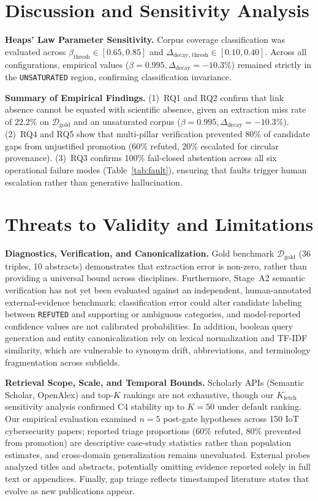 \documentclass[runningheads]{llncs}
\begin{document}
\section{Discussion and Sensitivity Analysis}
\label{sec:discussion}

\noindent\textbf{Heaps' Law Parameter Sensitivity.} Corpus coverage classification was evaluated across $\beta_{\text{thresh}} \in [0.65, 0.85]$ and $\Delta_{\text{decay, thresh}} \in [0.10, 0.40]$. Across all configurations, empirical values ($\beta = 0.995, \Delta_{\text{decay}} = -10.3\%$) remained strictly in the \texttt{UNSATURATED} region, confirming classification invariance.

\noindent\textbf{Summary of Empirical Findings.} (1)~RQ1 and RQ2 confirm that link absence cannot be equated with scientific absence, given an extraction miss rate of $22.2\%$ on $\mathcal{D}_{\text{gold}}$ and an unsaturated corpus ($\beta = 0.995, \Delta_{\text{decay}} = -10.3\%$). (2)~RQ4 and RQ5 show that multi-pillar verification prevented 80\% of candidate gaps from unjustified promotion (60\% refuted, 20\% escalated for circular provenance). (3)~RQ3 confirms 100\% fail-closed abstention across all six operational failure modes (Table~\ref{tab:fault}), ensuring that faults trigger human escalation rather than generative hallucination.

\section{Threats to Validity and Limitations}
\label{sec:threats}

\noindent\textbf{Diagnostics, Verification, and Canonicalization.} Gold benchmark $\mathcal{D}_{\text{gold}}$ (36 triples, 10 abstracts) demonstrates that extraction error is non-zero, rather than providing a universal bound across disciplines. Furthermore, Stage~A2 semantic verification has not yet been evaluated against an independent, human-annotated external-evidence benchmark; classification error could alter candidate labeling between \texttt{REFUTED} and supporting or ambiguous categories, and model-reported confidence values are not calibrated probabilities. In addition, boolean query generation and entity canonicalization rely on lexical normalization and TF-IDF similarity, which are vulnerable to synonym drift, abbreviations, and terminology fragmentation across subfields.

\noindent\textbf{Retrieval Scope, Scale, and Temporal Bounds.} Scholarly APIs (Semantic Scholar, OpenAlex) and top-$K$ rankings are not exhaustive, though our $K_{\text{fetch}}$ sensitivity analysis confirmed C4 stability up to $K=50$ under default ranking. Our empirical evaluation examined $n=5$ post-gate hypotheses across 150 IoT cybersecurity papers; reported triage proportions ($60\%$ refuted, $80\%$ prevented from promotion) are descriptive case-study statistics rather than population estimates, and cross-domain generalization remains unevaluated. External probes analyzed titles and abstracts, potentially omitting evidence reported solely in full text or appendices. Finally, gap triage reflects timestamped literature states that evolve as new publications appear.
\end{document}
